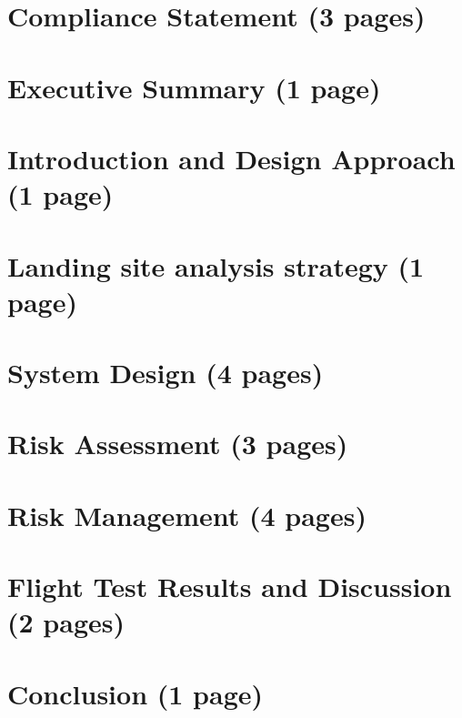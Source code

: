 \documentclass{article}
\begin{document}
\newpage

\section{Compliance Statement (3 pages)}


\newpage
\section{Executive Summary (1 page)}


\newpage
\section{Introduction and Design Approach (1 page)}


\newpage
\section{Landing site analysis strategy (1 page)}


\newpage
\section{System Design (4 pages)}


\newpage
\section{Risk Assessment (3 pages)}


\newpage
\section{Risk Management (4 pages)}


\newpage
\section{Flight Test Results and Discussion (2 pages)}


\newpage
\section{Conclusion (1 page)}

\end{document}
